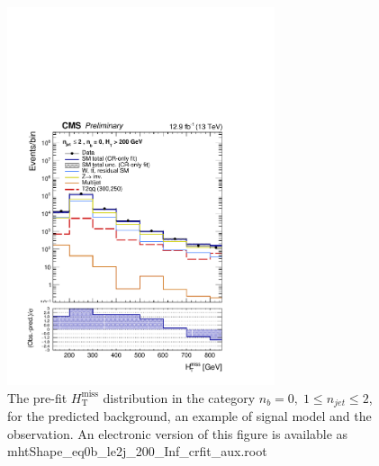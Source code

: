 \clearpage



\clearpage



\clearpage



\clearpage




\clearpage
\begin{figure}[tbhp]
    \caption{ 
    The pre-fit $H_{\mathrm{T}}^{\mathrm{miss}}$ distribution in the category $n_{b}=0, \; 1 \leq n_{jet} \leq 2$, 
    for the predicted background, an example of signal model and the observation.
    An electronic version of this figure is available as mhtShape\_eq0b\_le2j\_200\_Inf\_crfit\_aux.root
    \label{fig:mhtShape_eq0b_le2j_crfit} }
  \begin{center}
  \includegraphics[width=0.7\textwidth]{mhtShape_eq0b_le2j_200_Inf_crfit_aux}
  \end{center}
\end{figure}

